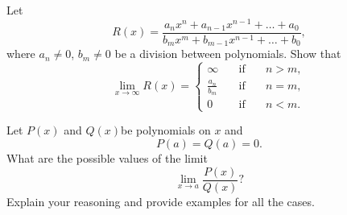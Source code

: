 \documentclass[11pt]{article}%
\begin{document}
\begin{Exercise}[title=**]
	 Let $$R(x)=\frac{a_nx^n+a_{n-1}x^{n-1}+\ldots+a_0}{b_mx^m+b_{m-1}x^{n-1}+\ldots+b_0},$$ where $a_n\neq 0$, $b_m\neq 0$ be a division between polynomials. Show that 
$$\lim\limits_{x\to\infty}R(x)=\left\{\begin{array}{lllc}\infty \quad & \text{if}\quad & n>m,\\
	\frac{a_n}{b_m} &\text{if}  & n=m,\\
	0&\text{if}  & n<m.
\end{array}\right.
$$
\end{Exercise}


\begin{Exercise}[title=**$\dagger$] Let $P(x)$ and $Q(x)$be polynomials on $x$ and $$P(a)=Q(a)=0.$$ What are the possible values of the limit $$\lim\limits_{x\to a}\frac{P(x)}{Q(x)}?$$ Explain your reasoning and provide examples for all the cases.
\end{Exercise}
\end{document}

